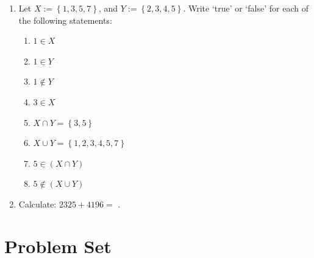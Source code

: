 \documentclass{tufte-book}
\begin{document}
\begin{enumerate}
  \item Let $X := \left\{1, 3, 5, 7\right\}$, and $Y := \left\{2, 3, 4, 5\right\}$.
  Write `true' or `false' for each of the following statements:
  \begin{multicols}{2}
    \begin{enumerate}
      \item $1 \in X$ \dotfill\bigskip
      \item $1 \in Y$ \dotfill\bigskip
      \item $1 \notin Y$ \dotfill\bigskip
      \item $3 \in X$ \dotfill
      \item $X \cap Y = \left\{3, 5\right\}$ \dotfill\bigskip
      \item $X \cup Y = \left\{1, 2, 3, 4, 5, 7\right\}$ \dotfill\bigskip
      \item $5 \in \left(X \cap Y\right)$ \dotfill\bigskip
      \item $5 \notin \left(X \cup Y\right)$ \dotfill\bigskip
    \end{enumerate}
  \end{multicols}
  
  \item Calculate: $2325 + 4196 =$ \dotfill.
\end{enumerate}

\clearpage\section{Problem Set }
\end{document}
